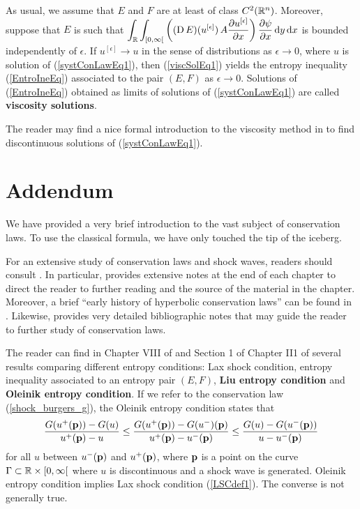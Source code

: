 As usual, we assume that $E$ and $F$ are at least of class
$C^2(\mathbb{R}^n)$.  Moreover, suppose that $E$ is such that
$\displaystyle \int_{\mathbb{R}} \int_{[0,\infty[}
\left( (\operatorname{D} E)(u^{[\epsilon]}) \,
A \frac{\partial{u^{[\epsilon]}}}{\partial x} \right) \frac{\partial{\psi}}{\partial x} \,\mathrm{d}{y}\,\mathrm{d}{x}$ is
bounded independently of $\epsilon$.
If $u^{[\epsilon]} \to u$ in the sense of distributions as
$\epsilon \to 0$, where $u$ is solution of (\ref{systConLawEq1}),
then (\ref{viscSolEq1}) yields
the entropy inequality (\ref{EntroIneEq}) associated to the pair
$(E,F)$ as $\epsilon \to 0$.  Solutions of (\ref{EntroIneEq})
obtained as limits of solutions of (\ref{systConLawEq1}) are called
{\bfseries viscosity solutions}.

The reader may find a nice formal introduction to the viscosity method in
\cite{Sal} to find discontinuous solutions of (\ref{systConLawEq1}).

\section{Addendum}

We have provided a very brief introduction to the vast subject of
conservation laws.  To use the classical formula, we have only
touched the tip of the iceberg.

For an extensive study of conservation laws and shock waves, readers
should consult \cite{Daf,LeF,Smo}.  In particular, \cite{Daf}
provides extensive notes at the end of each chapter to direct the
reader to further reading and the source of the material in the
chapter.  Moreover, a brief ``early history of hyperbolic
conservation laws'' can be found in \cite{Daf}.  Likewise, \cite{LeF}
provides very detailed bibliographic notes that may guide the reader
to further study of conservation laws.

The reader can find in Chapter VIII of \cite{Daf} and Section 1 of
Chapter II1 of \cite{LeF} several results comparing different entropy
conditions: Lax shock condition, entropy inequality associated to an
entropy pair $(E,F)$, 
{\bfseries Liu entropy condition} and 
{\bfseries Oleinik entropy condition}.  If we refer to the conservation law
(\ref{shock_burgers_g}), the Oleinik entropy condition states that
\[
\frac{G(u^+(\mathbf{p})) - G(u)}{u^+(\mathbf{p}) - u} \leq 
\frac{G(u^+(\mathbf{p})) - G(u^-)(\mathbf{p})}{u^+(\mathbf{p}) - u^-(\mathbf{p})}
\leq \frac{G(u) - G(u^-(\mathbf{p}))}{u - u^-(\mathbf{p})}
\]
for all $u$ between $u^-(\mathbf{p})$ and $u^+(\mathbf{p})$, where
$\mathbf{p}$ is a point on the curve $\Gamma \subset \mathbb{R}\times [0,\infty[$
where $u$ is discontinuous and a shock wave is generated.  Oleinik entropy
condition implies Lax shock condition (\ref{LSCdef1}).  The converse
is not generally true.

